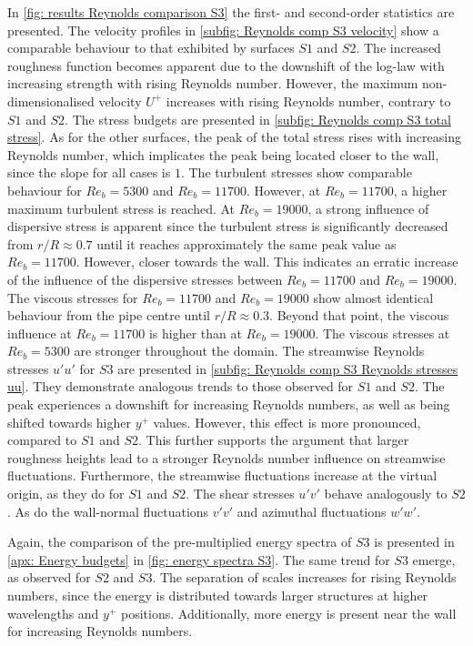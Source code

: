 In \autoref{fig: results Reynolds comparison S3} the first- and second-order statistics are presented.
The velocity profiles in \autoref{subfig: Reynolds comp S3 velocity} show a comparable behaviour to that exhibited by surfaces $S1$ and $S2$.
The increased roughness function becomes apparent due to the downshift of the log-law with increasing strength with rising Reynolds number.
However, the maximum non-dimensionalised velocity $U^+$ increases with rising Reynolds number, contrary to $S1$ and $S2$.
The stress budgets are presented in \autoref{subfig: Reynolds comp S3 total stress}.
As for the other surfaces, the peak of the total stress rises with increasing Reynolds number, which implicates the peak being located closer to the wall, since the slope for all cases is $1$.
The turbulent stresses show comparable behaviour for $Re_b = 5300$ and $Re_b = 11700$.
However, at $Re_b = 11700$, a higher maximum turbulent stress is reached.
At $Re_b = 19000$, a strong influence of dispersive stress is apparent since the turbulent stress is significantly decreased from $r/R \approx 0.7$ until it reaches approximately the same peak value as $Re_b = 11700$.
However, closer towards the wall.
This indicates an erratic increase of the influence of the dispersive stresses between $Re_b = 11700$ and $Re_b = 19000$.
The viscous stresses for $Re_b = 11700$ and $Re_b = 19000$ show almost identical behaviour from the pipe centre until $r/R \approx 0.3$.
Beyond that point, the viscous influence at $Re_b = 11700$ is higher than at $Re_b = 19000$.
The viscous stresses at $Re_b = 5300$ are stronger throughout the domain.
The streamwise Reynolds stresses $u'u'$ for $S3$ are presented in \autoref{subfig: Reynolds comp S3 Reynolds stresses uu}.
They demonstrate analogous trends to those observed for $S1$ and $S2$.
The peak experiences a downshift for increasing Reynolds numbers, as well as being shifted towards higher $y^+$ values.
However, this effect is more pronounced, compared to $S1$ and $S2$.
This further supports the argument that larger roughness heights lead to a stronger Reynolds number influence on streamwise fluctuations.
Furthermore, the streamwise fluctuations increase at the virtual origin, as they do for $S1$ and $S2$.
The shear stresses $u'v'$ behave analogously to $S2$.
As do the wall-normal fluctuations $v'v'$ and azimuthal fluctuations $w'w'$.

Again, the comparison of the pre-multiplied energy spectra of $S3$ is presented in \autoref{apx: Energy budgets} in \autoref{fig: energy spectra S3}.
The same trend for $S3$ emerge, as observed for $S2$ and $S3$.
The separation of scales increases for rising Reynolds numbers, since the energy is distributed towards larger structures at higher wavelengths and $y^+$ positions.
Additionally, more energy is present near the wall for increasing Reynolds numbers.
\newpage
